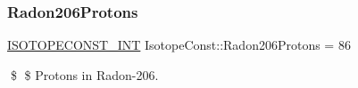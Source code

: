 \subsubsection{\texorpdfstring{Radon206\+Protons}{Radon206Protons}}
{\footnotesize\ttfamily \mbox{\hyperlink{group___isotope_const-_macros_ga5f18360b3e99483a35c32d789e62621c}{I\+S\+O\+T\+O\+P\+E\+C\+O\+N\+S\+T\+\_\+\+I\+NT}} Isotope\+Const\+::\+Radon206\+Protons = 86}

\$ \$ Protons in Radon-\/206. 